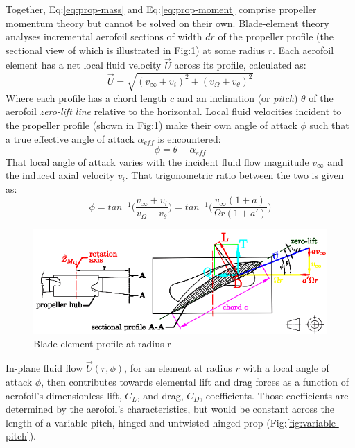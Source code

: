 \par
Together, Eq:\ref{eq:prop-mass} and Eq:\ref{eq:prop-moment} comprise propeller momentum theory but cannot be solved on their own. Blade-element theory analyses incremental aerofoil sections of width $dr$ of the propeller profile (the sectional view of which is illustrated in Fig:\ref{fig:bem-profile}) at some radius $r$. Each aerofoil element has a net local fluid velocity $\vec{U}$ across its profile, calculated as:
\begin{equation}
\vec{U}=\sqrt{(v_\infty+v_i)^2+(v_\Omega+v_\theta)^2}
\end{equation}
Where each profile has a chord length $c$ and an inclination (or \emph{pitch}) $\theta$ of the aerofoil \emph{zero-lift line} relative to the horizontal. Local fluid velocities incident to the propeller profile (shown in Fig:\ref{fig:bem-profile}) make their own angle of attack $\phi$ such that a true effective angle of attack $\alpha_{eff}$ is encountered:
\begin{equation}
\phi=\theta-\alpha_{eff}
\end{equation}
That local angle of attack varies with the incident fluid flow magnitude $v_\infty$ and the induced axial velocity $v_i$. That trigonometric ratio between the two is given as:
\begin{equation}
\phi=tan^{-1}\bigg(\frac{v_\infty+v_i}{v_\Omega+v_\theta}\bigg)=tan^{-1}\bigg(\frac{v_\infty(1+a)}{\Omega r(1+a')}\bigg)
\end{equation}
\par
\begin{figure}[hbtp]
\vspace{-15pt}
\centering
\includegraphics[width=\textwidth]{figs/bem-profile}
\caption{Blade element profile at radius r}
\label{fig:bem-profile}
\end{figure}
In-plane fluid flow $\vec{U}(r,\phi)$, for an element at radius $r$ with a local angle of attack $\phi$, then contributes towards elemental lift and drag forces as a function of aerofoil's dimensionless lift, $C_L$, and drag, $C_D$, coefficients. Those coefficients are determined by the aerofoil's characteristics, but would be constant across the length of a variable pitch, hinged and untwisted hinged prop (Fig:\ref{fig:variable-pitch}).
